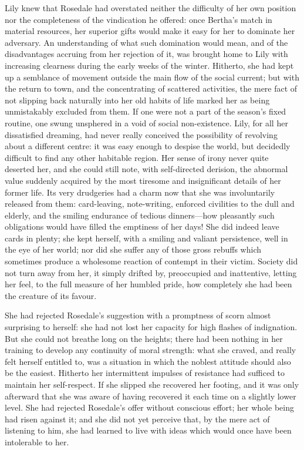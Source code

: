 \documentclass[12pt,a4paper]{book}
\begin{document}
Lily knew that Rosedale had overstated neither the difficulty of
her own position nor the completeness of the vindication he
offered: once Bertha's match in material resources, her superior
gifts would make it easy for her to dominate her adversary. An
understanding of what such domination would mean, and of the
disadvantages accruing from her rejection of it, was
brought home to Lily with increasing clearness during the early
weeks of the winter. Hitherto, she had kept up a semblance of
movement outside the main flow of the social current; but with
the return to town, and the concentrating of scattered
activities, the mere fact of not slipping back naturally into her
old habits of life marked her as being unmistakably excluded from
them. If one were not a part of the season's fixed routine, one
swung unsphered in a void of social non-existence. Lily, for all
her dissatisfied dreaming, had never really conceived the
possibility of revolving about a different centre: it was easy
enough to despise the world, but decidedly difficult to find any
other habitable region. Her sense of irony never quite deserted
her, and she could still note, with self-directed derision, the
abnormal value suddenly acquired by the most tiresome and
insignificant details of her former life. Its very drudgeries had
a charm now that she was involuntarily released from them: 
card-leaving, note-writing, enforced civilities to the dull and
elderly, and the smiling endurance of tedious dinners---how
pleasantly such obligations would have filled the emptiness of
her days! She did indeed leave cards in plenty; she kept herself,
with a smiling and valiant persistence, well in the eye of her
world; nor did she suffer any of those gross rebuffs which
sometimes produce a wholesome reaction of contempt in their
victim. Society did not turn away from her, it simply drifted by,
preoccupied and inattentive, letting her feel, to the full
measure of her humbled pride, how completely she had been the
creature of its favour.





She had rejected Rosedale's suggestion with a promptness of scorn
almost surprising to herself: she had not lost her capacity for
high flashes of indignation. But she could not breathe long on
the heights; there had been nothing in her training to develop
any continuity of moral strength: what she craved, and really
felt herself entitled to, was a situation in which the noblest
attitude should also be the easiest. Hitherto her intermittent
impulses of resistance had sufficed to maintain her self-respect. 
If she slipped she recovered her footing, and it was only
afterward that she was aware of having recovered it each time on
a slightly lower level. She had rejected Rosedale's offer without
conscious effort; her whole being had risen against it;
and she did not yet perceive that, by the mere act of listening
to him, she had learned to live with ideas which would once have
been intolerable to her.
\end{document}
